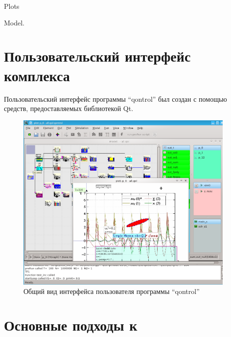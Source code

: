 Plots

Model.








\section{Пользовательский интерфейс комплекса} %

Пользовательский интерфейс программы ``qontrol'' был создан с помощью
средств, предоставляемых библиотекой Qt.

\begin{figure}[htb!]
  \begin{center}
    \includegraphics[width=0.96\textwidth]{p/qontrol_all.png}
  \end{center}
  \caption{Общий вид интерфейса пользователя программы ``qontrol''}
  \label{atu:f:qontrol_all}
\end{figure}









\section{Основные подходы к } %


